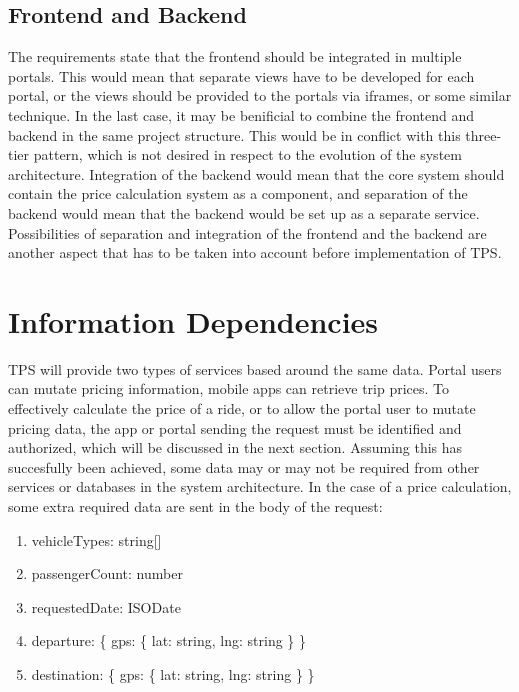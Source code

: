 \subsection{Frontend and Backend}
The requirements state that the frontend should be integrated in multiple portals. This would mean that separate views have to be developed for each portal, or the views should be provided to the portals via iframes, or some similar technique. In the last case, it may be benificial to combine the frontend and backend in the same project structure. This would be in conflict with this three-tier pattern, which is not desired in respect to the evolution of the system architecture. Integration of the backend would mean that the core system should contain the price calculation system as a component, and separation of the backend would mean that the backend would be set up as a separate service. Possibilities of separation and integration of the frontend and the backend are another aspect that has to be taken into account before implementation of TPS.

%
\section{Information Dependencies}
TPS will provide two types of services based around the same data. Portal users can mutate pricing information, mobile apps can retrieve trip prices. To effectively calculate the price of a ride, or to allow the portal user to mutate pricing data, the app or portal sending the request must be identified and authorized, which will be discussed in the next section. Assuming this has succesfully been achieved, some data may or may not be required from other services or databases in the system architecture. In the case of a price calculation, some extra required data are sent in the body of the request:

\begin{enumerate}
	\item vehicleTypes: string[]
	\item passengerCount: number
	\item requestedDate: ISODate
	\item departure: \{ gps: \{ lat: string, lng: string \} \}
	\item destination: \{ gps: \{ lat: string, lng: string \} \}
\end{enumerate}

